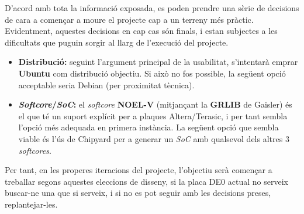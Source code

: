 \documentclass{article}
\begin{document}
D'acord amb tota la informació exposada, es poden prendre una sèrie de decisions de cara a començar a moure el projecte cap a un terreny més pràctic. Evidentment, aquestes decisions en cap cas són finals, i estan subjectes a les dificultats que puguin sorgir al llarg de l'execució del projecte.

\begin{itemize}
\item \textbf{Distribució:} seguint l'argument principal de la usabilitat, s'intentarà emprar \textbf{Ubuntu} com distribució objectiu. Si això no fos possible, la següent opció acceptable seria Debian (per proximitat tècnica).

\item \textbf{\textit{Softcore}/\textit{SoC}:} el \textit{softcore} \textbf{NOEL-V} (mitjançant la \textbf{GRLIB} de Gaisler) és el que té un suport explícit per a plaques Altera/Terasic, i per tant sembla l'opció més adequada en primera instància. La següent opció que sembla viable és l'ús de Chipyard per a generar un \textit{SoC} amb qualsevol dels altres 3 \textit{softcores}.
\end{itemize}

Per tant, en les properes iteracions del projecte, l'objectiu serà començar a treballar segons aquestes eleccions de disseny, si la placa DE0 actual no serveix buscar-ne una que si serveix, i si no es pot seguir amb les decisions preses, replantejar-les.

\newpage

\printbibliography[title={Bibliografia web}]
\end{document}
